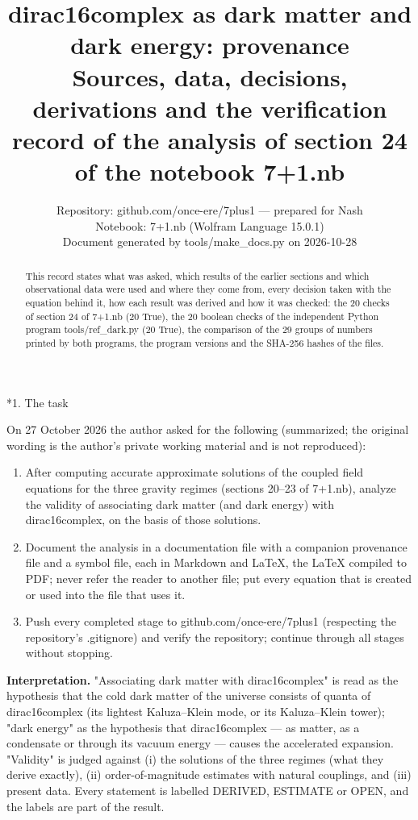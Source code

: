 \documentclass[10pt,a4paper]{article}
\makeatletter
\renewcommand\section{\@startsection{section}{1}{\z@}{-3.5ex \@plus -1ex \@minus -.2ex}{2.3ex \@plus.2ex}{\normalfont\Large\bfseries\raggedright}}
\makeatother
\begin{document}
\title{dirac16complex as dark matter and dark energy: provenance\\[0.4em]\large Sources, data, decisions, derivations and the verification record of the analysis of section 24 of the notebook 7+1.nb}
\author{Repository: github.com/once-ere/7plus1 — prepared for Nash\\ Notebook: 7+1.nb (Wolfram Language 15.0.1)\\ Document generated by tools/make\_docs.py on 2026-10-28}
\date{}
\maketitle
\begin{abstract}
This record states what was asked, which results of the earlier sections and which observational data were used and where they come from, every decision taken with the equation behind it, how each result was derived and how it was checked: the 20 checks of section 24 of 7+1.nb (20 True), the 20 boolean checks of the independent Python program tools/ref\_dark.py (20 True), the comparison of the 29 groups of numbers printed by both programs, the program versions and the SHA-256 hashes of the files.
\end{abstract}
\tableofcontents
{}\section*{1. The task}
On 27 October 2026 the author asked for the following (summarized; the original wording is the author’s private working material and is not reproduced):

\begin{enumerate}
\item After computing accurate approximate solutions of the coupled field equations for the three gravity regimes (sections 20–23 of 7+1.nb), analyze the validity of associating dark matter (and dark energy) with dirac16complex, on the basis of those solutions.
\item Document the analysis in a documentation file with a companion provenance file and a symbol file, each in Markdown and LaTeX, the LaTeX compiled to PDF; never refer the reader to another file; put every equation that is created or used into the file that uses it.
\item Push every completed stage to github.com/once-ere/7plus1 (respecting the repository’s .gitignore) and verify the repository; continue through all stages without stopping.
\end{enumerate}
\textbf{Interpretation.} "Associating dark matter with dirac16complex" is read as the hypothesis that the cold dark matter of the universe consists of quanta of dirac16complex (its lightest Kaluza–Klein mode, or its Kaluza–Klein tower); "dark energy" as the hypothesis that dirac16complex — as matter, as a condensate or through its vacuum energy — causes the accelerated expansion. "Validity" is judged against (i) the solutions of the three regimes (what they derive exactly), (ii) order-of-magnitude estimates with natural couplings, and (iii) present data. Every statement is labelled DERIVED, ESTIMATE or OPEN, and the labels are part of the result.
\end{document}
